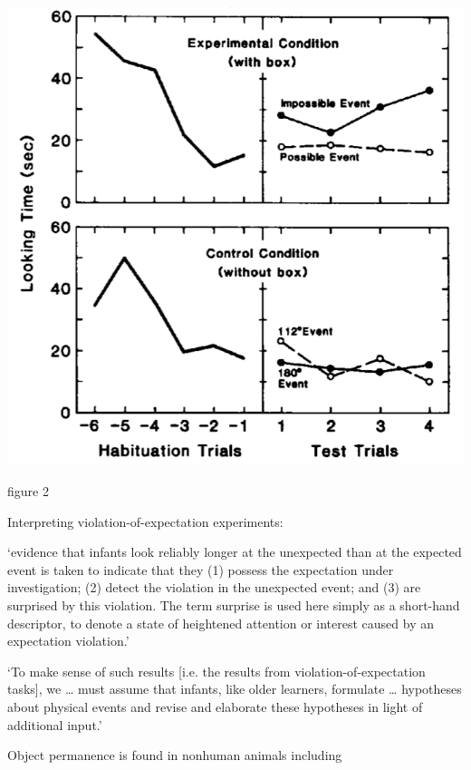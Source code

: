 \documentclass[12pt]{extarticle}
\begin{document}
\begin{multicols}{3}
\begin{center}
\includegraphics[scale=0.3]{img/baillargeon_1987_fig2.neg.png}
\end{center}
\begin{center} \citealp{baillargeon:1987_object} figure 2 \end{center}
 
Interpreting violation-of-expectation experiments:
 
‘evidence that infants look reliably longer at the unexpected than at the expected event is taken to indicate that they (1) possess the expectation under investigation; (2) detect the violation in the unexpected event; and (3) are surprised by this violation. The term surprise is used here simply as a short-hand descriptor, to denote a state of heightened attention or interest caused by an expectation violation.’
\citep[p.\ 168]{wang:2004_young}
 
‘To make sense of such results [i.e. the results from violation-of-expectation tasks], we … must assume that infants, like older learners, formulate … hypotheses about physical events and revise and elaborate these hypotheses in light of additional input.’
\citep[p.\ 329]{Aguiar:2002ob}
 
Object permanence is found in nonhuman animals including
 
\begin{enumerate}
 

\end{enumerate}
\end{multicols}
\end{document}
